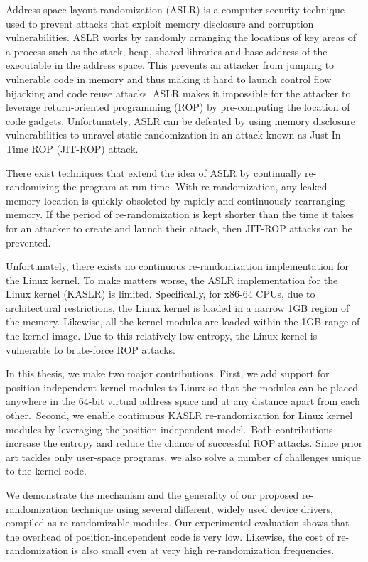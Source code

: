Address space layout randomization (ASLR) is a computer security technique used to prevent attacks that exploit memory disclosure and corruption vulnerabilities. ASLR works by randomly arranging the locations of key areas of a process such as the stack, heap, shared libraries and base address of the executable in the address space. This prevents an attacker from jumping to vulnerable code in memory and thus making it hard to launch control flow hijacking and code reuse attacks. ASLR makes it impossible for the attacker to leverage return-oriented programming (ROP) by pre-computing the location of code gadgets. Unfortunately, ASLR can be defeated by using memory disclosure vulnerabilities to unravel static randomization in an attack known as Just-In-Time ROP (JIT-ROP) attack.

There exist techniques that extend the idea of ASLR by continually re-randomizing the program at run-time. With re-randomization, any leaked memory location is quickly obsoleted by rapidly and continuously rearranging memory. If the period of re-randomization is kept shorter than the time it takes for an attacker to create and launch their attack, then JIT-ROP attacks can be prevented.

Unfortunately, there exists no continuous re-randomization implementation for the Linux kernel. To make matters worse, the ASLR implementation for the Linux kernel (KASLR) is limited. Specifically, for x86-64 CPUs, due to architectural restrictions, the Linux kernel is loaded in a narrow 1GB region of the memory.
Likewise, all the kernel modules are loaded within the 1GB range of the kernel image.
Due to this relatively low entropy, the Linux kernel is vulnerable to brute-force ROP attacks.

In this thesis, we make two major contributions.
First, we add support for position-independent kernel modules to Linux so that the modules can be placed anywhere in the 64-bit virtual address space and at any distance apart from each other.\ssrgContribution~Second, we enable continuous KASLR re-randomization for Linux kernel modules by leveraging the position-independent model.\ssrgEvolution~Both contributions increase the entropy and reduce the chance of successful ROP attacks. Since prior art tackles only user-space programs, we also solve a number of challenges unique to the kernel code.

We demonstrate the mechanism and the generality of our proposed re-randomization technique using several different, widely used device drivers, compiled as re-randomizable modules. Our experimental evaluation shows that the overhead of position-independent code is very low. Likewise, the cost of re-randomization is also small even at very high re-randomization frequencies.